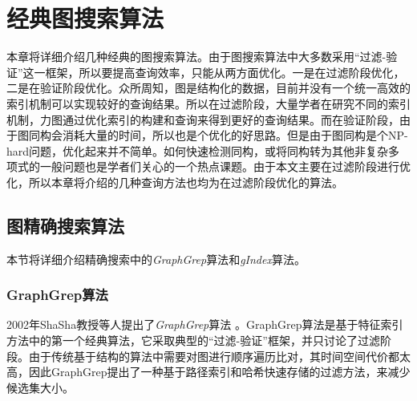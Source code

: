 \documentclass{XDBAthesis}
\begin{document}
\def\pictures{}
\else
\fi
\chapter{经典图搜索算法}
\label{chap:classic}
本章将详细介绍几种经典的图搜索算法。由于图搜索算法中大多数采用“过滤-验证”这一框架，所以要提高查询效率，只能从两方面优化。一是在过滤阶段优化，二是在验证阶段优化。众所周知，图是结构化的数据，目前并没有一个统一高效的索引机制可以实现较好的查询结果。所以在过滤阶段，大量学者在研究不同的索引机制，力图通过优化索引的构建和查询来得到更好的查询结果。而在验证阶段，由于图同构会消耗大量的时间，所以也是个优化的好思路。但是由于图同构是个NP-hard问题，优化起来并不简单。如何快速检测同构，或将同构转为其他非复杂多项式的一般问题也是学者们关心的一个热点课题。由于本文主要在过滤阶段进行优化，所以本章将介绍的几种查询方法也均为在过滤阶段优化的算法。
\section{图精确搜索算法}
本节将详细介绍精确搜索中的\emph{GraphGrep}算法\cite{graphgrep}和\emph{gIndex}算法\cite{gIndex}。
\subsection{GraphGrep算法}
2002年ShaSha教授等人提出了\emph{GraphGrep}算法\cite{graphgrep} 。GraphGrep算法是基于特征索引方法中的第一个经典算法，它采取典型的“过滤-验证”框架，并只讨论了过滤阶段。由于传统基于结构的算法中需要对图进行顺序遍历比对，其时间空间代价都太高，因此GraphGrep提出了一种基于路径索引和哈希快速存储的过滤方法，来减少候选集大小。
\end{document}
